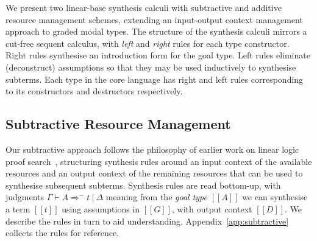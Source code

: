 We present two linear-base synthesis calculi with subtractive and additive resource
management schemes, extending an input-output context management approach to graded
modal types. The structure of the synthesis calculi mirrors a
cut-free sequent calculus, with
\textit{left} and \textit{right} rules for each type constructor. Right rules
synthesise an introduction form for the goal type. Left rules
eliminate (deconstruct) assumptions so that they may be
used inductively to synthesise subterms. Each type in the
core language has right and left
rules corresponding to its constructors and destructors respectively.


\subsection{Subtractive Resource Management}
  Our subtractive approach follows the philosophy of earlier work on
  linear logic proof search~\cite{HODAS1994327,CERVESATO2000133},
  structuring synthesis rules around an input context of the available
  resources and an output context of the remaining resources that
  can be used to synthesise subsequent subterms. Synthesis rules
  are read bottom-up, with judgments $\Gamma \vdash A \Rightarrow^{-} t\ |\ \Delta$
  meaning from the \emph{goal type} $[[A]]$ we can synthesise a term $[[t]]$ using
  assumptions in $[[G]]$, with output context $[[D]]$. We describe
  the rules in turn to aid understanding. Appendix~\ref{app:subtractive} collects the
  rules for reference.


